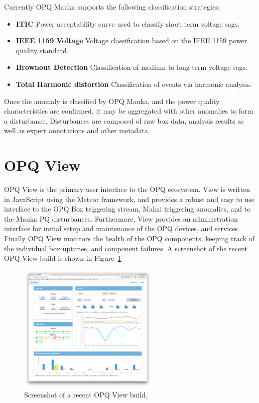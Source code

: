Currently OPQ Mauka supports the following classification strategies:
\begin{itemize}
	\item{\textbf{ITIC}} Power acceptability curve used to classify short term voltage sags.
	\item{\textbf{IEEE 1159 Voltage}} Voltage classification based on the IEEE 1159 power quality standard.
	\item{\textbf{Brownout Detection}} Classification of medium to long term voltage sags.
	\item{\textbf{Total Harmonic distortion}} Classification of events via harmonic analysis.
\end{itemize}

Once the anomaly is classified by OPQ Mauka, and the power quality characteristics are confirmed, it may be aggregated with other anomalies to form a disturbance.
Disturbances are composed of raw box data, analysis results as well as expert annotations and other metadata.

\section{OPQ View}\label{sec:opq-view}

OPQ View is the primary user interface to the OPQ ecosystem.
View is written in JavaScript using the Meteor framework, and provides a robust and easy to use interface to the OPQ Box triggering stream, Makai triggering anomalies, and to the Mauka PQ disturbances.
Furthermore, View provides an administration interface for initial setup and maintenance of the OPQ devices, and services.
Finally OPQ View monitors the health of the OPQ components, keeping track of the individual box uptimes, and component failures.
A screenshot of the recent OPQ View build is shown in Figure~\ref{fig:opq:12}

\begin{figure}[h]
  \begin{center}
  \includegraphics[width=0.6\textwidth]{img/opqview-landing-page.png}
  \end{center}
  \caption{Screenshot of a recent OPQ View build.}
  \label{fig:opq:12}
\end{figure}
